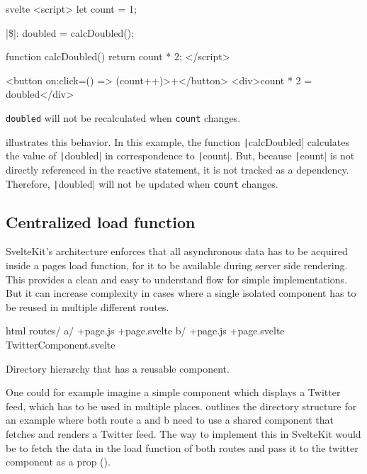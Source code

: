 \begin{listing}[h!]
\begin{myminted}[escapeinside=||, autogobble]{svelte}{}
<script>
    let count = 1;

    |\$|: doubled = calcDoubled();

    function calcDoubled() {
        return count * 2;
    }
</script>

<button on:click={() => (count++)}>+</button>
<div>{count} * 2 = {doubled}</div>
\end{myminted}
\caption{\texttt{doubled} will not be recalculated when \texttt{count} changes.}
\label{fig:evaluation-reactivity-hidden-dependency}
\end{listing}

 illustrates this behavior. In this example, the function \texttt|calcDoubled| calculates the value of \texttt|doubled| in correspondence to \texttt|count|. But, because \texttt|count| is not directly referenced in the reactive statement, it is not tracked as a dependency. Therefore, \texttt|doubled| will not be updated when \texttt{count} changes.

\subsection{Centralized load function}
SvelteKit's architecture enforces that all asynchronous data has to be acquired inside a pages load function, for it to be available during server side rendering. This provides a clean and easy to understand flow for simple implementations. But it can increase complexity in cases where a single isolated component has to be reused in multiple different routes.

\begin{listing}[h]
\begin{myminted}{html}{}
routes/
  a/
    +page.js
    +page.svelte
  b/
    +page.js
    +page.svelte
  TwitterComponent.svelte
\end{myminted}
\caption{Directory hierarchy that has a reusable component.}
\label{fig:evaluation-reusable-file-hierarchy}
\end{listing}

One could for example imagine a simple component which displays a Twitter feed, which has to be used in multiple places.  outlines the directory structure for an example where both route a and b need to use a shared component that fetches and renders a Twitter feed. The way to implement this in SvelteKit would be to fetch the data in the load function of both routes and pass it to the twitter component as a prop ().


